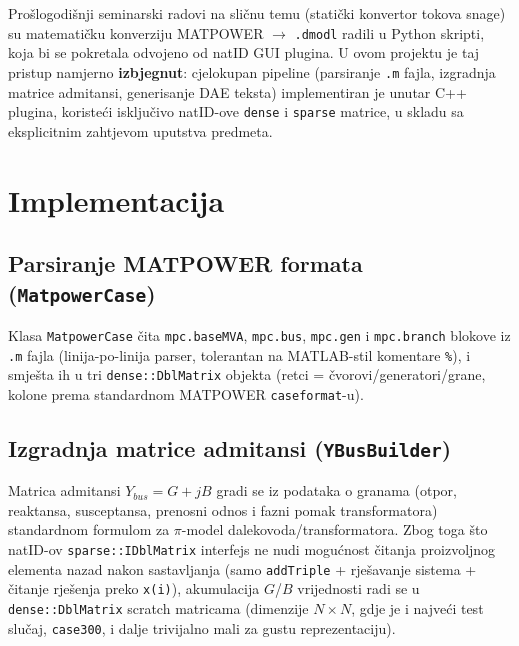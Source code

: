 \documentclass[11pt,a4paper]{report}
\begin{document}
Prošlogodišnji seminarski radovi na sličnu temu (statički konvertor tokova snage) su
matematičku konverziju MATPOWER $\to$ \texttt{.dmodl} radili u Python skripti, koja bi se
pokretala odvojeno od natID GUI plugina. U ovom projektu je taj pristup namjerno
\textbf{izbjegnut}: cjelokupan pipeline (parsiranje \texttt{.m} fajla, izgradnja matrice
admitansi, generisanje DAE teksta) implementiran je unutar C++ plugina, koristeći
isključivo natID-ove \texttt{dense} i \texttt{sparse} matrice, u skladu sa eksplicitnim
zahtjevom uputstva predmeta.


\chapter{Implementacija}
\label{ch:implementacija}

\section{Parsiranje MATPOWER formata (\texttt{MatpowerCase})}

Klasa \texttt{MatpowerCase} čita \texttt{mpc.baseMVA}, \texttt{mpc.bus},
\texttt{mpc.gen} i \texttt{mpc.branch} blokove iz \texttt{.m} fajla (linija-po-linija
parser, tolerantan na MATLAB-stil komentare \texttt{\%}), i smješta ih u tri
\texttt{dense::DblMatrix} objekta (retci = čvorovi/generatori/grane, kolone prema
standardnom MATPOWER \texttt{caseformat}-u).

\section{Izgradnja matrice admitansi (\texttt{YBusBuilder})}

Matrica admitansi $Y_{bus} = G + jB$ gradi se iz podataka o granama (otpor, reaktansa,
susceptansa, prenosni odnos i fazni pomak transformatora) standardnom formulom za
$\pi$-model dalekovoda/transformatora. Zbog toga što natID-ov \texttt{sparse::IDblMatrix}
interfejs ne nudi mogućnost čitanja proizvoljnog elementa nazad nakon sastavljanja (samo
\texttt{addTriple} + rješavanje sistema + čitanje rješenja preko \texttt{x(i)}), akumulacija
$G$/$B$ vrijednosti radi se u \texttt{dense::DblMatrix} scratch matricama (dimenzije
$N\times N$, gdje je i najveći test slučaj, \texttt{case300}, i dalje trivijalno mali za
gustu reprezentaciju).
\end{document}
